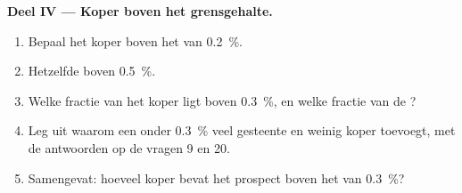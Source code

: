 \begin{problem}
\noindent\textbf{Deel IV --- Koper boven het grensgehalte.}
\begin{enumerate}[resume]
  \item Bepaal het koper boven het  van \qty{0.2}{\percent}.
  \item Hetzelfde boven \qty{0.5}{\percent}.
  \item Welke fractie van het koper ligt boven \qty{0.3}{\percent}, en welke fractie van de
        ?
  \item Leg uit waarom een  onder \qty{0.3}{\percent} veel gesteente en weinig
        koper toevoegt, met de antwoorden op de vragen 9 en 20.
  \item Samengevat: hoeveel koper bevat het prospect boven het  van \qty{0.3}{\percent}?
\end{enumerate}
\end{problem}
